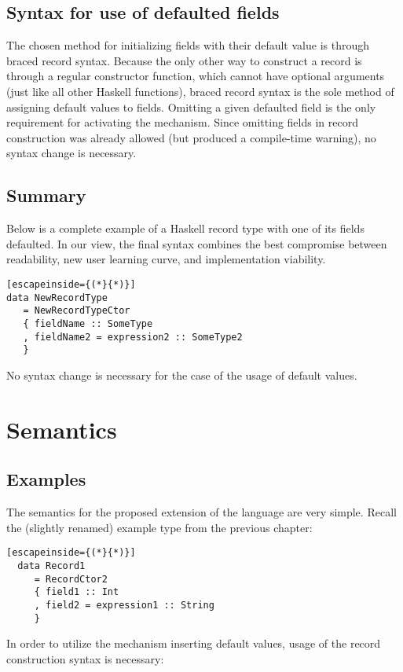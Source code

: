 \documentclass[en]{pracamgr}
\begin{document}
\section{Syntax for use of defaulted fields}

The chosen method for initializing fields with their default value is through braced record syntax.
Because the only other way to construct a record is through a regular constructor function, which cannot have optional arguments (just like all other Haskell functions), braced record syntax is the sole method of assigning default values to fields.
Omitting a given defaulted field is the only requirement for activating the mechanism. 
Since omitting fields in record construction was already allowed (but produced a compile-time warning), no syntax change is necessary.

\section{Summary}
Below is a complete example of a Haskell record type with one of its fields defaulted. 
In our view, the final syntax combines the best compromise between readability, new user learning curve, and implementation viability.

\begin{lstlisting}[escapeinside={(*}{*)}]
data NewRecordType
   = NewRecordTypeCtor 
   { fieldName :: SomeType 
   , fieldName2 = expression2 :: SomeType2
   }
\end{lstlisting}
No syntax change is necessary for the case of the usage of default values.


\chapter{Semantics}
\section{Examples}
The semantics for the proposed extension of the language are very simple.
Recall the (slightly renamed) example type from the previous chapter:

\begin{lstlisting}[escapeinside={(*}{*)}]
  data Record1
     = RecordCtor2 
     { field1 :: Int
     , field2 = expression1 :: String
     }
\end{lstlisting}
  
In order to utilize the mechanism inserting default values, usage of the record construction syntax is necessary:
\end{document}
